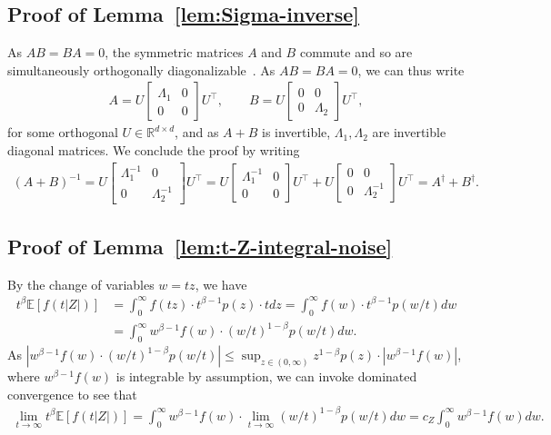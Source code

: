 \documentclass[11pt]{article}
\newcommand{\Ep}{\mathbb{E}}
\newcommand{\R}{\mathbb{R}} %
\newcommand{\<}{\langle} %
\renewcommand{\>}{\rangle}
\begin{document}
\subsection{Proof of Lemma~\ref{lem:Sigma-inverse}}
\label{proof:Sigma-inverse}

As $AB=BA=0$, the symmetric matrices $A$ and $B$ commute and so are
simultaneously orthogonally diagonalizable~\cite[Thm.~4.5.15]{HornJo85}. As
$AB=BA=0$, we can thus write
\begin{align*}
	A = U \begin{bmatrix} \Lambda_1 & 0 \\ 0 & 0 \end{bmatrix} U^\top  , \qquad B = U \begin{bmatrix} 0 & 0 \\ 0 & \Lambda_2 \end{bmatrix} U^\top  ,
\end{align*}
for some orthogonal $U \in \R^{d \times d}$, and as $A+B$ is invertible,  $\Lambda_1, \Lambda_2$ are invertible diagonal matrices. We conclude the proof by writing
\begin{align*}
	(A+ B)^{-1} = U \begin{bmatrix} \Lambda_1^{-1} & 0 \\ 0 & \Lambda_2^{-1} \end{bmatrix} U^\top = U \begin{bmatrix} \Lambda_1^{-1} & 0 \\ 0 & 0 \end{bmatrix} U^\top + U \begin{bmatrix} 0 & 0 \\ 0 & \Lambda_2^{-1} \end{bmatrix} U^\top = A^\dagger + B^\dagger .
\end{align*}

\subsection{Proof of Lemma~\ref{lem:t-Z-integral-noise}}  \label{proof:t-Z-integral-noise}
By the change of variables $w =t z$, we have
\begin{align*}
	t^\beta \Ep [f(t|Z|)] & = \int_{0}^{\infty} f(t z) \cdot t^{\beta - 1} p(z)  \cdot td z =  \int_{0}^{\infty} f(w) \cdot t^{\beta-1} p (w/t) d w \\
	& =  \int_{0}^{\infty} w^{\beta - 1} f(w) \cdot (w/t)^{1-\beta} p (w/t) d w.
\end{align*}
As $|  w^{\beta - 1} f(w) \cdot (w/t)^{1-\beta} p (w/t)| \leq \sup_{z \in (0, \infty)} z^{1-\beta} p(z) \cdot |w^{\beta - 1} f(w)|$, where $w^{\beta - 1} f(w)$ is integrable by assumption, we can invoke dominated convergence to see that
\begin{align*}
	\lim_{t \to \infty} t^\beta \Ep [f(t|Z|)] = \int_{0}^{\infty} w^{\beta - 1} f(w) \cdot \lim_{t \to \infty} (w/t)^{1-\beta} p (w/t) d w = c_Z \int_{0}^{\infty} w^{\beta - 1} f(w) dw.
\end{align*}
\end{document}

